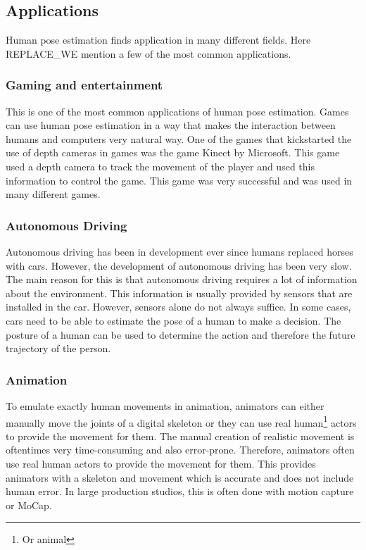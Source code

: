 \subsection{Applications}

Human pose estimation finds application in many different fields. Here REPLACE_WE mention a few of the most common applications.

\subsubsection{Gaming and entertainment}

This is one of the most common applications of human pose estimation. Games can use human pose estimation in a way that makes the interaction between humans and computers very natural way. One of the games that kickstarted the use of depth cameras in games was the game Kinect by Microsoft. This game used a depth camera to track the movement of the player and used this information to control the game. This game was very successful and was used in many different games. 

\subsubsection{Autonomous Driving}

Autonomous driving has been in development ever since humans replaced horses with cars. However, the development of autonomous driving has been very slow. The main reason for this is that autonomous driving requires a lot of information about the environment. This information is usually provided by sensors that are installed in the car. However, sensors alone do not always suffice. In some cases, cars need to be able to estimate the pose of a human to make a decision. The posture of a human can be used to determine the action and therefore the future trajectory of the person. 

\subsubsection{Animation}

To emulate exactly human movements in animation, animators can either manually move the joints of a digital skeleton or they can use real human\footnote{Or animal} actors to provide the movement for them. The manual creation of realistic movement is oftentimes very time-consuming and also error-prone. Therefore, animators often use real human actors to provide the movement for them. This provides animators with a skeleton and movement which is accurate and does not include human error. In large production studios, this is often done with motion capture or MoCap. 

